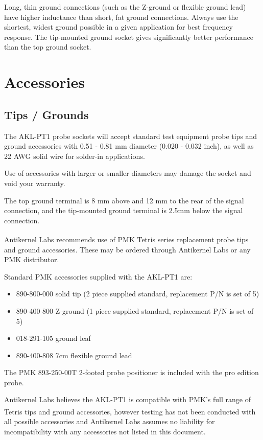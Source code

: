 \documentclass[11pt]{article}
\begin{document}
Long, thin ground connections (such as the Z-ground or flexible ground lead) have higher inductance than short, fat
ground connections. Always use the shortest, widest ground possible in a given application for best frequency response.
The tip-mounted ground socket gives significantly better performance than the top ground socket.

\section{Accessories}

\subsection{Tips / Grounds}

The AKL-PT1 probe sockets will accept standard test equipment probe tips and ground accessories with 0.51 - 0.81 mm
diameter (0.020 - 0.032 inch), as well as 22 AWG solid wire for solder-in applications.

Use of accessories with larger or smaller diameters may damage the socket and void your warranty.

The top ground terminal is 8 mm above and 12 mm to the rear of the signal connection, and the tip-mounted ground
terminal is 2.5mm below the signal connection.

Antikernel Labs recommends use of PMK Tetris\textsuperscript{\textregistered} series replacement probe tips and ground
accessories. These may be ordered through Antikernel Labs or any PMK distributor.

Standard PMK accessories supplied with the AKL-PT1 are:
\begin{itemize}
\item 890-800-000 solid tip (2 piece supplied standard, replacement P/N is set of 5)
\item 890-400-800 Z-ground (1 piece supplied standard, replacement P/N is set of 5)
\item 018-291-105 ground leaf
\item 890-400-808 7cm flexible ground lead
\end{itemize}

The PMK 893-250-00T 2-footed probe positioner is included with the pro edition probe.

Antikernel Labs believes the AKL-PT1 is compatible with PMK's full range of Tetris\textsuperscript{\textregistered}
tips and ground accessories, however testing has not been conducted with all possible accessories and Antikernel Labs
assumes no liability for incompatibility with any accessories not listed in this document.
\end{document}
